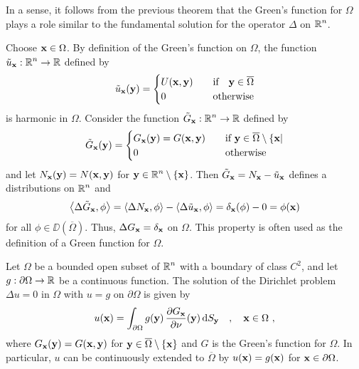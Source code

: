 \begin{rmk}
In a sense, it follows from the previous theorem that the Green's
function for $\Omega$ plays a role similar to the fundamental solution
for the operator $\Delta$ on $\displaystyle \mathbb{R}^n$.
\label{GreenFunctAltDefn}

Choose $\mathbf{x}\in \Omega$.  By definition of the Green's function on
$\Omega$, the function
$\displaystyle \tilde{u}_{\mathbf{x}}: \mathbb{R}^n \rightarrow \mathbb{R}$ defined by
\[
\tilde{u}_{\mathbf{x}}(\mathbf{y}) =
\begin{cases}
U(\mathbf{x},\mathbf{y}) & \quad \text{if} \quad
\mathbf{y} \in \overline{\Omega} \\
0 & \quad \text{otherwise}
\end{cases}
\]
is harmonic in $\Omega$.  Consider the function
$\displaystyle \tilde{G}_{\mathbf{x}}: \mathbb{R}^n \rightarrow \mathbb{R}$ defined by
\[
\tilde{G}_{\mathbf{x}}(\mathbf{y}) =
\begin{cases}
G_{\mathbf{x}}(\mathbf{y}) = G(\mathbf{x},\mathbf{y}) & \quad \text{if} \
\mathbf{y} \in \overline{\Omega} \setminus \{\mathbf{x}| \\
0 & \quad \text{otherwise}
\end{cases}
\]
and let $N_{\mathbf{x}}(\mathbf{y}) = N(\mathbf{x},\mathbf{y})$
for $\displaystyle \mathbf{y} \in \mathbb{R}^n\setminus \{\mathbf{x}\}$.
Then $\tilde{G}_{\mathbf{x}} = N_{\mathbf{x}} - \tilde{u}_{\mathbf{x}}$
defines a distributions on $\displaystyle \mathbb{R}^n$ and
\[
\left\langle{\Delta \tilde{G}_{\mathbf{x}}} , {\phi}\right\rangle = \left\langle{\Delta N_{\mathbf{x}}} , {\phi}\right\rangle
- \left\langle{\Delta \tilde{u}_{\mathbf{x}}} , {\phi}\right\rangle =
\delta_{\mathbf{x}}(\phi) - 0 = \phi(\mathbf{x})
\]
for all $\phi \in \DD(\overline{\Omega})$.  Thus,
$\Delta G_{\mathbf{x}} = \delta_{\mathbf{x}}$ on $\Omega$.  This property is
often used as the definition of a Green function for $\Omega$.
\end{rmk}

\begin{theorem} \label{laplace_dirichlet2}
Let $\Omega$ be a bounded open subset of $\displaystyle \mathbb{R}^n$ with a
boundary of class $\displaystyle C^2$, and let
$g:\partial \Omega \rightarrow \mathbb{R}$ be a
continuous function.  The solution of the Dirichlet problem
$\Delta u = 0$ in $\Omega$ with $u=g$ on $\partial \Omega$ is given by
\[
u(\mathbf{x}) = \int_{\partial \Omega} g(\mathbf{y})\,
\frac{\partial{G_{\mathbf{x}}}}{\partial \mathbf{\nu}}(\mathbf{y})\,\mathrm{d}{S}_{\mathbf{y}}
\quad , \quad \mathbf{x} \in \Omega \  ,
\]
where $G_{\mathbf{x}}(\mathbf{y}) = G(\mathbf{x},\mathbf{y})$ for
$\mathbf{y} \in \overline{\Omega} \setminus \{\mathbf{x}\}$ and $G$ is the
Green's function for $\Omega$.  In particular, $u$ can be continuously
extended to $\overline{\Omega}$ by $u(\mathbf{x}) = g(\mathbf{x})$ for
$\mathbf{x} \in \partial \Omega$.
\end{theorem}

